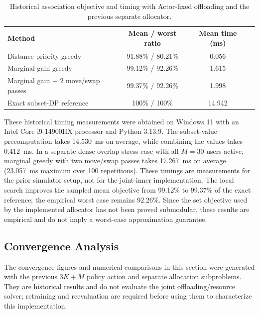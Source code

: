 \documentclass[journal]{IEEEtran}
\begin{document}
\begin{table}[t]
\centering
\caption{Historical association objective and timing with Actor-fixed offloading and the previous separate allocator.}
\label{tab:association_quality}
\begin{tabular}{lccc}
\hline
Method & Mean / worst ratio & Mean time (ms) \\
\hline
Distance-priority greedy & 91.88\% / 80.21\% & 0.056 \\
Marginal-gain greedy & 99.12\% / 92.26\% & 1.615 \\
Marginal gain + 2 move/swap passes & 99.37\% / 92.26\% & 1.998 \\
Exact subset-DP reference & 100\% / 100\% & 14.942 \\
\hline
\end{tabular}
\end{table}

These historical timing measurements were obtained on Windows 11 with an Intel Core
i9-14900HX processor and Python 3.13.9. The subset-value precomputation takes
14.530~ms on average, while combining the values takes 0.412~ms. In a separate
dense-overlap stress case with all
$M=30$ users active, marginal greedy with two move/swap passes takes 17.267~ms
on average (23.057~ms maximum over 100 repetitions). These timings are
measurements for the prior simulator setup, not for the joint-inner implementation. The local search
improves the sampled mean objective from 99.12\% to 99.37\% of the exact
reference; the empirical worst case remains 92.26\%. Since the set objective
used by the implemented allocator has not been proved submodular, these
results are empirical and do not imply a worst-case approximation guarantee.



\subsection{Convergence Analysis}
The convergence figures and numerical comparisons in this section were
generated with the previous $3K+M$ policy action and separate allocation
subproblems. They are historical results and do not evaluate the joint
offloading/resource solver; retraining and reevaluation are required before
using them to characterize this implementation.
\end{document}
